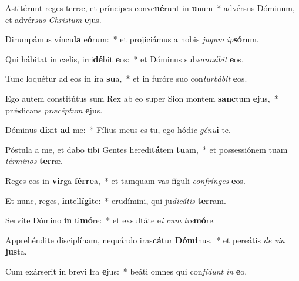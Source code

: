 \item Astitérunt reges terræ, et príncipes conve\textbf{né}runt in \textbf{u}num~* advérsus Dóminum, et advér\textit{sus} \textit{Chris}\textit{tum} \textbf{e}jus.
\item Dirumpámus víncu\textbf{la} e\textbf{ó}rum:~* et projiciámus a nobis \textit{ju}\textit{gum} \textit{ip}\textbf{só}rum.
\item Qui hábitat in cælis, irri\textbf{dé}bit \textbf{e}os:~* et Dóminus sub\textit{san}\textit{ná}\textit{bit} \textbf{e}os.
\item Tunc loquétur ad eos in \textbf{i}ra \textbf{su}a,~* et in furóre suo con\textit{tur}\textit{bá}\textit{bit} \textbf{e}os.
\item Ego autem constitútus sum Rex ab eo super Sion montem \textbf{sanc}tum \textbf{e}jus,~* prǽdicans \textit{præ}\textit{cép}\textit{tum} \textbf{e}jus.
\item Dóminus \textbf{di}xit \textbf{ad} me:~* Fílius meus es tu, ego hódi\textit{e} \textit{gé}\textit{nu}\textbf{i} te.
\item Póstula a me, et dabo tibi Gentes heredi\textbf{tá}tem \textbf{tu}am,~* et possessiónem tuam \textit{tér}\textit{mi}\textit{nos} \textbf{ter}ræ.
\item Reges eos in \textbf{vir}ga \textbf{fér}\textbf{re}a,~* et tamquam vas fíguli \textit{con}\textit{frín}\textit{ges} \textbf{e}os.
\item Et nunc, reges, \textbf{in}tel\textbf{lí}\textbf{gi}te:~* erudímini, qui ju\textit{di}\textit{cá}\textit{tis} \textbf{ter}ram.
\item Servíte Dómino \textbf{in} ti\textbf{mó}re:~* et exsultáte e\textit{i} \textit{cum} \textit{tre}\textbf{mó}re.
\item Apprehéndite disciplínam, nequándo iras\textbf{cá}tur \textbf{Dó}\textbf{mi}nus,~* et pereátis \textit{de} \textit{vi}\textit{a} \textbf{jus}ta.
\item Cum exárserit in brevi \textbf{i}ra \textbf{e}jus:~* beáti omnes qui con\textit{fí}\textit{dunt} \textit{in} \textbf{e}o.
